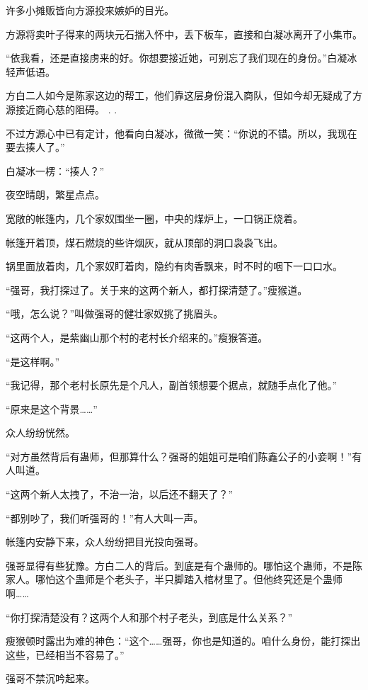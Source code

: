 
\begin{this_body}

许多小摊贩皆向方源投来嫉妒的目光。

方源将卖叶子得来的两块元石揣入怀中，丢下板车，直接和白凝冰离开了小集市。

“依我看，还是直接虏来的好。你想要接近她，可别忘了我们现在的身份。”白凝冰轻声低语。

方白二人如今是陈家这边的帮工，他们靠这层身份混入商队，但如今却无疑成了方源接近商心慈的阻碍。 . .

不过方源心中已有定计，他看向白凝冰，微微一笑：“你说的不错。所以，我现在要去揍人了。”

白凝冰一楞：“揍人？”

夜空晴朗，繁星点点。

宽敞的帐篷内，几个家奴围坐一圈，中央的煤炉上，一口锅正烧着。

帐篷开着顶，煤石燃烧的些许烟灰，就从顶部的洞口袅袅飞出。

锅里面放着肉，几个家奴盯着肉，隐约有肉香飘来，时不时的咽下一口口水。

“强哥，我打探过了。关于来的这两个新人，都打探清楚了。”瘦猴道。

“哦，怎么说？”叫做强哥的健壮家奴挑了挑眉头。

“这两个人，是紫幽山那个村的老村长介绍来的。”瘦猴答道。

“是这样啊。”

“我记得，那个老村长原先是个凡人，副首领想要个据点，就随手点化了他。”

“原来是这个背景……”

众人纷纷恍然。

“对方虽然背后有蛊师，但那算什么？强哥的姐姐可是咱们陈鑫公子的小妾啊！”有人叫道。

“这两个新人太拽了，不治一治，以后还不翻天了？”

“都别吵了，我们听强哥的！”有人大叫一声。

帐篷内安静下来，众人纷纷把目光投向强哥。

强哥显得有些犹豫。方白二人的背后。到底是有个蛊师的。哪怕这个蛊师，不是陈家人。哪怕这个蛊师是个老头子，半只脚踏入棺材里了。但他终究还是个蛊师啊……

“你打探清楚没有？这两个人和那个村子老头，到底是什么关系？”

瘦猴顿时露出为难的神色：“这个……强哥，你也是知道的。咱什么身份，能打探出这些，已经相当不容易了。”

强哥不禁沉吟起来。


\end{this_body}

